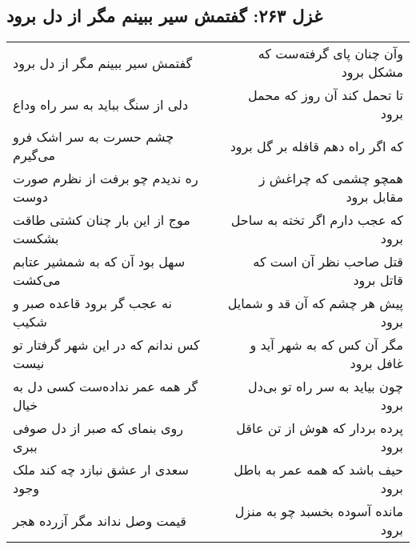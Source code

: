 \begin{center}
\section*{غزل ۲۶۳: گفتمش سیر ببینم مگر از دل برود}
\label{sec:263}
\begin{longtable}{l p{0.5cm} r}
گفتمش سیر ببینم مگر از دل برود
&&
وآن چنان پای گرفته‌ست که مشکل برود
\\
دلی از سنگ بباید به سر راه وداع
&&
تا تحمل کند آن روز که محمل برود
\\
چشم حسرت به سر اشک فرو می‌گیرم
&&
که اگر راه دهم قافله بر گل برود
\\
ره ندیدم چو برفت از نظرم صورت دوست
&&
همچو چشمی که چراغش ز مقابل برود
\\
موج از این بار چنان کشتی طاقت بشکست
&&
که عجب دارم اگر تخته به ساحل برود
\\
سهل بود آن که به شمشیر عتابم می‌کشت
&&
قتل صاحب نظر آن است که قاتل برود
\\
نه عجب گر برود قاعده صبر و شکیب
&&
پیش هر چشم که آن قد و شمایل برود
\\
کس ندانم که در این شهر گرفتار تو نیست
&&
مگر آن کس که به شهر آید و غافل برود
\\
گر همه عمر نداده‌ست کسی دل به خیال
&&
چون بیاید به سر راه تو بی‌دل برود
\\
روی بنمای که صبر از دل صوفی ببری
&&
پرده بردار که هوش از تن عاقل برود
\\
سعدی ار عشق نبازد چه کند ملک وجود
&&
حیف باشد که همه عمر به باطل برود
\\
قیمت وصل نداند مگر آزرده هجر
&&
مانده آسوده بخسبد چو به منزل برود
\\
\end{longtable}
\end{center}
